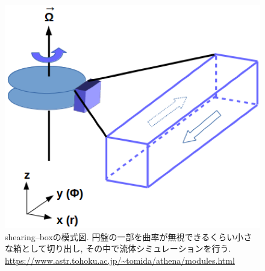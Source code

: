 \documentclass[a4paper,10pt,oneside,twocolumn,notitlepage,final,dvipdfmx]{jarticle}
\begin{document}
 \begin{figure}
  \centering
  \includegraphics[width=0.9\linewidth]{./contents/shearing_box_TMD.png}
  \caption{shearing--boxの模式図. 円盤の一部を曲率が無視できるくらい小さな箱として切り出し, その中で流体シミュレーションを行う. \url{https://www.astr.tohoku.ac.jp/~tomida/athena/modules.html}}\label{fig:TMDbox}
 \end{figure}
\end{document}

